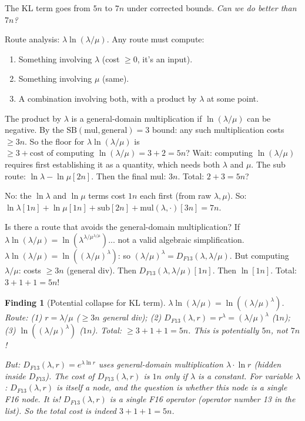 \documentclass[11pt]{article}
\newtheorem{finding}[theorem]{Finding}
\newcommand{\warn}[1]{\textcolor{warn}{#1}}
\begin{document}
The KL term goes from $5n$ to $7n$ under corrected bounds.
\emph{Can we do better than $7n$?}

Route analysis: $\lambda\ln(\lambda/\mu)$. Any route must compute:
\begin{enumerate}
  \item Something involving $\lambda$ (cost $\geq 0$, it's an input).
  \item Something involving $\mu$ (same).
  \item A combination involving both, with a product by $\lambda$ at some point.
\end{enumerate}

The product by $\lambda$ is a general-domain multiplication if $\ln(\lambda/\mu)$ can be negative.
By the $\mathrm{SB}(\mathrm{mul},\mathrm{general}) = 3$ bound: any such multiplication costs $\geq 3n$.
So the floor for $\lambda\ln(\lambda/\mu)$ is $\geq 3 + \text{cost of computing }\ln(\lambda/\mu) = 3+2 = 5n$?
Wait: computing $\ln(\lambda/\mu)$ requires first establishing it as a quantity, which needs both $\lambda$ and $\mu$.
The sub route: $\ln\lambda - \ln\mu[2n]$. Then the final mul: $3n$. Total: $2+3 = 5n$?

No: the $\ln\lambda$ and $\ln\mu$ terms cost $1n$ each first (from raw $\lambda,\mu$). So:
$\ln\lambda[1n] + \ln\mu[1n] + \mathrm{sub}[2n] + \mathrm{mul}(\lambda, \cdot)[3n] = 7n$.

Is there a route that avoids the general-domain multiplication?
If $\lambda \ln(\lambda/\mu) = \ln(\lambda^{\lambda/\mu^{\lambda/\mu}})$... not a valid algebraic simplification.
$\lambda\ln(\lambda/\mu) = \ln((\lambda/\mu)^\lambda)$: so $(\lambda/\mu)^\lambda = D_{F13}(\lambda, \lambda/\mu)$.
But computing $\lambda/\mu$: costs $\geq 3n$ (general div). Then $D_{F13}(\lambda, \lambda/\mu)[1n]$. Then $\ln[1n]$. Total: $3+1+1 = 5n$!

\begin{finding}[Potential collapse for KL term]
$\lambda\ln(\lambda/\mu) = \ln((\lambda/\mu)^\lambda)$. Route:
(1) $r = \lambda/\mu$ ($\geq 3n$ general div);
(2) $D_{F13}(\lambda, r) = r^\lambda = (\lambda/\mu)^\lambda$ ($1n$);
(3) $\ln((\lambda/\mu)^\lambda)$ ($1n$).
Total: $\geq 3+1+1 = 5n$.
This is potentially \warn{$5n$, not $7n$}!

But: $D_{F13}(\lambda, r) = e^{\lambda\ln r}$ uses \emph{general-domain} multiplication $\lambda \cdot \ln r$
(hidden inside $D_{F13}$). The cost of $D_{F13}(\lambda, r)$ is $1n$ only if $\lambda$ is a constant.
For variable $\lambda$: $D_{F13}(\lambda, r)$ is itself a node, and the question is
whether this node is a single F16 node. It is! $D_{F13}(\lambda, r)$ is a single F16 operator
(operator number 13 in the list). So the total cost is indeed $3+1+1 = 5n$.
\end{finding}
\end{document}
